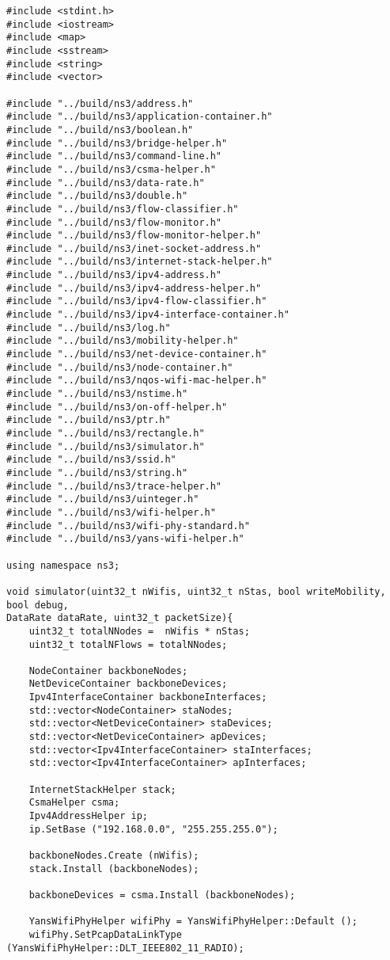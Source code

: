 \begin{lstlisting}
#include <stdint.h>
#include <iostream>
#include <map>
#include <sstream>
#include <string>
#include <vector>

#include "../build/ns3/address.h"
#include "../build/ns3/application-container.h"
#include "../build/ns3/boolean.h"
#include "../build/ns3/bridge-helper.h"
#include "../build/ns3/command-line.h"
#include "../build/ns3/csma-helper.h"
#include "../build/ns3/data-rate.h"
#include "../build/ns3/double.h"
#include "../build/ns3/flow-classifier.h"
#include "../build/ns3/flow-monitor.h"
#include "../build/ns3/flow-monitor-helper.h"
#include "../build/ns3/inet-socket-address.h"
#include "../build/ns3/internet-stack-helper.h"
#include "../build/ns3/ipv4-address.h"
#include "../build/ns3/ipv4-address-helper.h"
#include "../build/ns3/ipv4-flow-classifier.h"
#include "../build/ns3/ipv4-interface-container.h"
#include "../build/ns3/log.h"
#include "../build/ns3/mobility-helper.h"
#include "../build/ns3/net-device-container.h"
#include "../build/ns3/node-container.h"
#include "../build/ns3/nqos-wifi-mac-helper.h"
#include "../build/ns3/nstime.h"
#include "../build/ns3/on-off-helper.h"
#include "../build/ns3/ptr.h"
#include "../build/ns3/rectangle.h"
#include "../build/ns3/simulator.h"
#include "../build/ns3/ssid.h"
#include "../build/ns3/string.h"
#include "../build/ns3/trace-helper.h"
#include "../build/ns3/uinteger.h"
#include "../build/ns3/wifi-helper.h"
#include "../build/ns3/wifi-phy-standard.h"
#include "../build/ns3/yans-wifi-helper.h"

using namespace ns3;

void simulator(uint32_t nWifis, uint32_t nStas, bool writeMobility, bool debug, 
DataRate dataRate, uint32_t packetSize){
	uint32_t totalNNodes =  nWifis * nStas;
	uint32_t totalNFlows = totalNNodes;
	
	NodeContainer backboneNodes;
	NetDeviceContainer backboneDevices;
	Ipv4InterfaceContainer backboneInterfaces;
	std::vector<NodeContainer> staNodes;
	std::vector<NetDeviceContainer> staDevices;
	std::vector<NetDeviceContainer> apDevices;
	std::vector<Ipv4InterfaceContainer> staInterfaces;
	std::vector<Ipv4InterfaceContainer> apInterfaces;
	
	InternetStackHelper stack;
	CsmaHelper csma;
	Ipv4AddressHelper ip;
	ip.SetBase ("192.168.0.0", "255.255.255.0");
	
	backboneNodes.Create (nWifis);
	stack.Install (backboneNodes);
	
	backboneDevices = csma.Install (backboneNodes);
	
	YansWifiPhyHelper wifiPhy = YansWifiPhyHelper::Default ();
	wifiPhy.SetPcapDataLinkType (YansWifiPhyHelper::DLT_IEEE802_11_RADIO);
	

\end{lstlisting}
